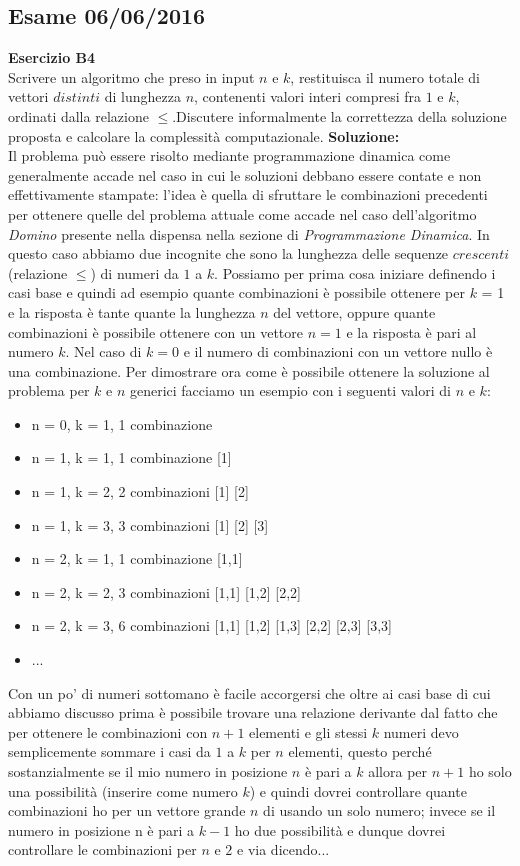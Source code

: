 \documentclass[../cheatSheetAlgoritmi.tex]{subfiles}
\begin{document}
\subsection{Esame 06/06/2016}
\textbf{Esercizio B4}\\
Scrivere un algoritmo che preso in input $n$ e $k$, restituisca il numero totale di vettori $distinti$ di lunghezza $n$, contenenti valori interi compresi fra $1$ e $k$, ordinati dalla relazione $\leq$.Discutere informalmente la correttezza della soluzione proposta e calcolare la complessità computazionale.
\textbf{Soluzione:}\\
Il problema può essere risolto mediante programmazione dinamica come generalmente accade nel caso in cui le soluzioni debbano essere contate e non effettivamente stampate: l'idea è quella di sfruttare le combinazioni precedenti per ottenere quelle del problema attuale come accade nel caso dell'algoritmo \emph{Domino} presente nella dispensa nella sezione di \emph{Programmazione Dinamica}. In questo caso abbiamo due incognite che sono la lunghezza delle sequenze $crescenti$ (relazione $\leq$) di numeri da $1$ a $k$. Possiamo per prima cosa iniziare definendo i casi base e quindi ad esempio quante combinazioni è possibile ottenere per $k$ = 1 e la risposta è tante quante la lunghezza $n$ del vettore, oppure quante combinazioni è possibile ottenere con un vettore $n = 1$ e la risposta è pari al numero $k$. Nel caso di $k = 0$ e il numero di combinazioni con un vettore nullo è una combinazione. Per dimostrare ora come è possibile ottenere la soluzione al problema per $k$ e $n$ generici facciamo un esempio con i seguenti valori di $n$ e $k$:
\begin{itemize}
	\item n = 0, k = 1, 1 combinazione
	\item n = 1, k = 1, 1 combinazione 		[1]
	\item n = 1, k = 2, 2 combinazioni 		[1] [2]
	\item n = 1, k = 3, 3 combinazioni		[1] [2] [3]
	\item n = 2, k = 1, 1 combinazione		[1,1]
	\item n = 2, k = 2, 3 combinazioni		[1,1] [1,2] [2,2]
	\item n = 2, k = 3, 6 combinazioni		[1,1] [1,2] [1,3] [2,2] [2,3] [3,3]
	\item ...
\end{itemize}
Con un po' di numeri sottomano è facile accorgersi che oltre ai casi base di cui abbiamo discusso prima è possibile trovare una relazione derivante dal fatto che per ottenere le combinazioni con $n+1$ elementi e gli stessi $k$ numeri devo semplicemente sommare i casi da $1$ a $k$ per $n$ elementi, questo perché sostanzialmente se il mio numero in posizione $n$ è pari a $k$ allora per $n+1$ ho solo una possibilità (inserire come numero $k$) e quindi dovrei controllare quante combinazioni ho per un vettore grande $n$ di usando un solo numero; invece se il numero in posizione n è pari a $k-1$ ho due possibilità e dunque dovrei controllare le combinazioni per $n$ e $2$ e via dicendo...
\end{document}
